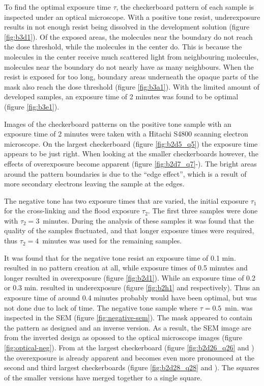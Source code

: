 To find the optimal exposure time $\tau$, the checkerboard pattern of each sample is inspected under an optical microscope. With a positive tone resist, underexposure results in not enough resist being dissolved in the development solution (figure \ref{fig:b3d1}). Of the exposed areas, the molecules near the boundary do not reach the dose threshold, while the molecules in the center do. This is because the molecules in the center receive much scattered light from neighbouring molecules, molecules near the boundary do not nearly have as many neighbours. When the resist is exposed for too long, boundary areas underneath the opaque parts of the mask also reach the dose threshold (figure \ref{fig:b3a1}). With the limited amount of developed samples, an exposure time of 2 minutes was found to be optimal (figure \ref{fig:b3e1}).

Images of the checkerboard patterns on the positive tone sample with an exposure time of 2 minutes were taken with a Hitachi S4800 scanning electron microscope. On the largest checkerboard (figure \ref{fig:b2d5_q5}) the exposure time appears to be just right. When looking at the smaller checkerboards however, the effects of overexposure become apparent (figure \ref{fig:b2d7_q7}-). The bright areas around the pattern boundaries is due to the ``edge effect'', which is a result of more secondary electrons leaving the sample at the edges.

The negative tone has two exposure times that are varied, the initial exposure $\tau_1$ for the cross-linking and the flood exposure $\tau_2$. The first three samples were done with $\tau_2 = 3$~minutes. During the analysis of these samples it was found that the quality of the samples fluctuated, and that longer exposure times were required, thus $\tau_2 = 4$~minutes was used for the remaining samples.

It was found that for the negative tone resist an exposure time of 0.1 min. resulted in no pattern creation at all, while exposure times of 0.5 minutes and longer resulted in overexposure (figure \ref{fig:b2d1}). While an exposure time of 0.2 or 0.3 min. resulted in underexposure (figure \ref{fig:b2h1} and  respectively). Thus an exposure time of around 0.4 minutes probably would have been optimal, but was not done due to lack of time. The negative tone sample where $\tau = 0.5$~min. was inspected in the SEM (figure \ref{fig:negative-sem}). The mask appeared to contain the pattern as designed and an inverse version. As a result, the SEM image are from the inverted design as opossed to the optical microscope images (figure \ref{fig:optical-neg}). From at the largest checkerboard (figure \ref{fig:b2d26_q26} and ) the overexposure is already apparent and becomes even more pronounced at the second and third largest checkerboards (figure \ref{fig:b2d28_q28} and ). The squares of the smaller versions have merged together to a single square.  


